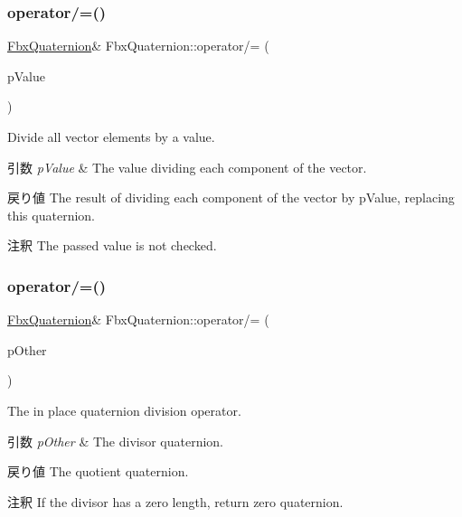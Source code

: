 \subsubsection{\texorpdfstring{operator/=()}{operator/=()}\hspace{0.1cm}{\footnotesize\ttfamily [1/2]}}
{\footnotesize\ttfamily \hyperlink{class_fbx_quaternion}{Fbx\+Quaternion}\& Fbx\+Quaternion\+::operator/= (\begin{DoxyParamCaption}\item[{double}]{p\+Value }\end{DoxyParamCaption})}

Divide all vector elements by a value. 
\begin{DoxyParams}{引数}
{\em p\+Value} & The value dividing each component of the vector. \\
\hline
\end{DoxyParams}
\begin{DoxyReturn}{戻り値}
The result of dividing each component of the vector by p\+Value, replacing this quaternion. 
\end{DoxyReturn}
\begin{DoxyRemark}{注釈}
The passed value is not checked. 
\end{DoxyRemark}
\mbox{\label{class_fbx_quaternion_a34cc4ef2a5eddb5546a223d7d85a9d6c}} 
\subsubsection{\texorpdfstring{operator/=()}{operator/=()}\hspace{0.1cm}{\footnotesize\ttfamily [2/2]}}
{\footnotesize\ttfamily \hyperlink{class_fbx_quaternion}{Fbx\+Quaternion}\& Fbx\+Quaternion\+::operator/= (\begin{DoxyParamCaption}\item[{const \hyperlink{class_fbx_quaternion}{Fbx\+Quaternion} \&}]{p\+Other }\end{DoxyParamCaption})}

The in place quaternion division operator. 
\begin{DoxyParams}{引数}
{\em p\+Other} & The divisor quaternion. \\
\hline
\end{DoxyParams}
\begin{DoxyReturn}{戻り値}
The quotient quaternion. 
\end{DoxyReturn}
\begin{DoxyRemark}{注釈}
If the divisor has a zero length, return zero quaternion. 
\end{DoxyRemark}
\mbox{\label{class_fbx_quaternion_add741768361b3ffe33c012e6585bc666}} 
